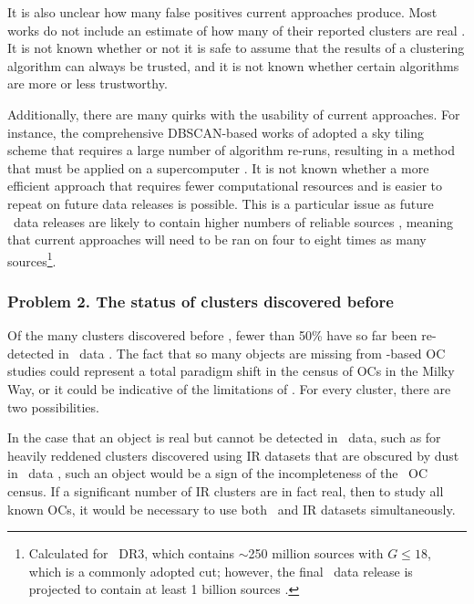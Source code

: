 It is also unclear how many false positives current approaches produce. Most works do not include an estimate of how many of their reported clusters are real \citep[e.g.][]{castro-ginard_new_2018,liu_catalog_2019,he_catalogue_2021}. It is not known whether or not it is safe to assume that the results of a clustering algorithm can always be trusted, and it is not known whether certain algorithms are more or less trustworthy.

Additionally, there are many quirks with the usability of current approaches. For instance, the comprehensive DBSCAN-based works of \cite{castro-ginard_new_2018,castro-ginard_hunting_2019,castro-ginard_hunting_2020,castro-ginard_hunting_2022} adopted a sky tiling scheme that requires a large number of algorithm re-runs, resulting in a method that must be applied on a supercomputer \citep{castro-ginard_hunting_2022}. It is not known whether a more efficient approach that requires fewer computational resources and is easier to repeat on future data releases is possible. This is a particular issue as future \gaia\ data releases are likely to contain higher numbers of reliable sources \citep{gaia_collaboration_gaia_2022}, meaning that current approaches will need to be ran on four to eight times as many sources\footnote{Calculated for \gaia\ DR3, which contains $\sim$250 million sources with $G\leq18$, which is a commonly adopted cut; however, the final \gaia\ data release is projected to contain at least 1 billion sources \citep{gaia_collaboration_gaia_2016}.}.


\subsubsection{Problem 2. The status of clusters discovered before \gaia}
\label{sec:intro:aims:issues:pre_gaia}

Of the many clusters discovered before \gaia, fewer than 50\% have so far been re-detected in \gaia\ data \citep{cantat-gaudin_gaia_2018,cantat-gaudin_clusters_2020}. The fact that so many objects are missing from \gaia-based OC studies could represent a total paradigm shift in the census of OCs in the Milky Way, or it could be indicative of the limitations of \gaia. For every cluster, there are two possibilities.

In the case that an object is real but cannot be detected in \gaia\ data, such as for heavily reddened clusters discovered using IR datasets that are obscured by dust in \gaia\ data \citep{cantat-gaudin_clusters_2020}, such an object would be a sign of the incompleteness of the \gaia\ OC census. If a significant number of IR clusters are in fact real, then to study all known OCs, it would be necessary to use both \gaia\ and IR datasets simultaneously.

